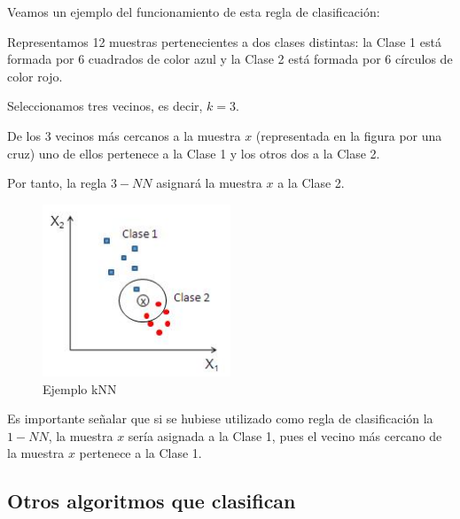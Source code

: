 \documentclass[a4paper, 11pt]{article} %
\begin{document}
Veamos un ejemplo del funcionamiento de esta regla de clasificación:
\begin{shaded}
Representamos 12 muestras pertenecientes a dos clases distintas: la Clase 1 está formada por 6 cuadrados de color azul y la Clase 2 está formada por 6 círculos de color rojo.

Seleccionamos tres vecinos, es decir, $k = 3$.

De los $3$ vecinos más cercanos a la muestra $x$ (representada en la figura por una cruz) uno de ellos pertenece a la Clase 1 y los otros dos a la Clase 2.

Por tanto, la regla $3-NN$ asignará la muestra $x$ a la Clase 2.
\end{shaded}

\begin{figure}[H]
\centering
\includegraphics[width=0.5\textwidth]{ejemploKNN.JPG}
\caption{Ejemplo kNN}
\label{Ejemplo kNN}
\end{figure}

\begin{shaded}
Es importante señalar que si se hubiese utilizado como regla de clasificación la $1-NN$, la muestra $x$ sería asignada a la Clase 1, pues el vecino más cercano de la muestra $x$ pertenece a la Clase 1.
\end{shaded}

\subsection{Otros algoritmos que clasifican}
\end{document}
